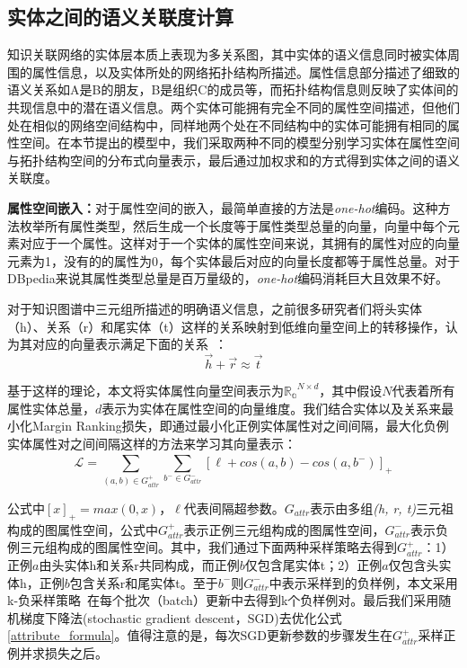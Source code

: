 \subsection{实体之间的语义关联度计算}
\label{subsec4-3-3}
知识关联网络的实体层本质上表现为多关系图，其中实体的语义信息同时被实体周围的属性信息，以及实体所处的网络拓扑结构所描述。属性信息部分描述了细致的语义关系如A是B的朋友，B是组织C的成员等，而拓扑结构信息则反映了实体间的共现信息中的潜在语义信息。两个实体可能拥有完全不同的属性空间描述，但他们处在相似的网络空间结构中，同样地两个处在不同结构中的实体可能拥有相同的属性空间。在本节提出的模型中，我们采取两种不同的模型分别学习实体在属性空间与拓扑结构空间的分布式向量表示，最后通过加权求和的方式得到实体之间的语义关联度。

\textbf{属性空间嵌入：}对于属性空间的嵌入，最简单直接的方法是\emph{one-hot}编码。这种方法枚举所有属性类型，然后生成一个长度等于属性类型总量的向量，向量中每个元素对应于一个属性。这样对于一个实体的属性空间来说，其拥有的属性对应的向量元素为1，没有的的属性为0，每个实体最后对应的向量长度都等于属性总量。对于DBpedia来说其属性类型总量是百万量级的，\emph{one-hot}编码消耗巨大且效果不好。

对于知识图谱中三元组所描述的明确语义信息，之前很多研究者们将头实体（h）、关系（r）和尾实体（t）这样的关系映射到低维向量空间上的转移操作，认为其对应的向量表示满足下面的关系~\cite{nips/BordesUGWY13, aaai/WuFCABW18}：
\begin{equation}
    \label{hrt}
    \vec h + \vec r \approx \vec t
\end{equation}

\noindent 基于这样的理论，本文将实体属性向量空间表示为$\mathbb{R_a} ^ {N \times d}$，其中假设$N$代表着所有属性实体总量，$d$表示为实体在属性空间的向量维度。我们结合实体以及关系来最小化Margin Ranking损失，即通过最小化正例实体属性对之间间隔，最大化负例实体属性对之间间隔这样的方法来学习其向量表示：
\begin{equation}
    \label{attribute_formula}
    \mathcal{L} = \sum_{(a,b) \in G_{attr}^+}^{ } \sum_{b^- \in G_{attr}^-}^{ }[\ell + cos(a,b)-cos(a,b^-)]_+
\end{equation}

\noindent 公式中$[x]_+=max(0, x)$，$\ell$代表间隔超参数。$G_{attr}$表示由多组\emph{(h, r, t)}三元祖构成的图属性空间，公式中$G_{attr}^+$表示正例三元组构成的图属性空间，$G_{attr}^-$表示负例三元组构成的图属性空间。其中，我们通过下面两种采样策略去得到$G_{attr}^+$：1）正例$a$由头实体h和关系r共同构成，而正例$b$仅包含尾实体t；2）正例$a$仅包含头实体h，正例$b$包含关系r和尾实体t。至于$b^-$则$G_{attr}^-$中表示采样到的负样例，本文采用k-负采样策略~\cite{corr/Mikolov13}在每个批次（batch）更新中去得到k个负样例对。最后我们采用随机梯度下降法(stochastic gradient descent，SGD)去优化公式\ref{attribute_formula}。值得注意的是，每次SGD更新参数的步骤发生在$G_{attr}^+$采样正例并求损失之后。

